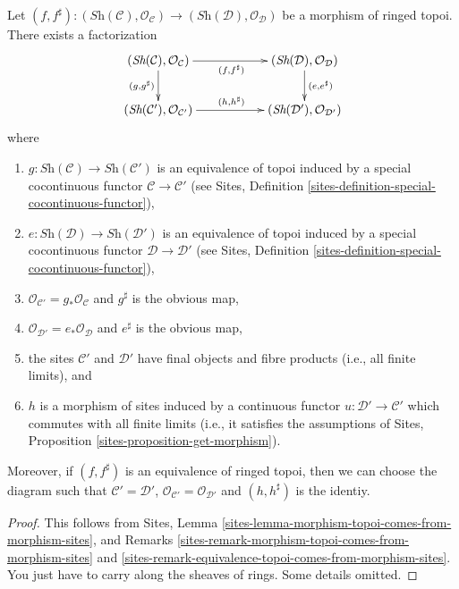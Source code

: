 \begin{lemma}
\label{lemma-morphism-ringed-topoi-comes-from-morphism-ringed-sites}
Let $(f, f^\sharp) :
(\textit{Sh}(\mathcal{C}), \mathcal{O}_{\mathcal{C}})
\to (\textit{Sh}(\mathcal{D}), \mathcal{O}_{\mathcal{D}})$
be a morphism of ringed topoi. There exists a factorization
$$
\xymatrix{
(\textit{Sh}(\mathcal{C}), \mathcal{O}_{\mathcal{C}})
\ar[rr]_{(f, f^\sharp)}
\ar[d]_{(g, g^\sharp)}
& &
(\textit{Sh}(\mathcal{D}), \mathcal{O}_{\mathcal{D}}) \ar[d]^{(e, e^\sharp)}
\\
(\textit{Sh}(\mathcal{C}'), \mathcal{O}_{\mathcal{C}'})
\ar[rr]^{(h, h^\sharp)} & &
(\textit{Sh}(\mathcal{D}'), \mathcal{O}_{\mathcal{D}'})
}
$$
where
\begin{enumerate}
\item $g : \textit{Sh}(\mathcal{C}) \to \textit{Sh}(\mathcal{C}')$
is an equivalence of topoi induced by a special cocontinuous functor
$\mathcal{C} \to \mathcal{C}'$ (see
Sites, Definition \ref{sites-definition-special-cocontinuous-functor}),
\item $e : \textit{Sh}(\mathcal{D}) \to \textit{Sh}(\mathcal{D}')$
is an equivalence of topoi induced by a special cocontinuous functor
$\mathcal{D} \to \mathcal{D}'$ (see
Sites, Definition \ref{sites-definition-special-cocontinuous-functor}),
\item $\mathcal{O}_{\mathcal{C}'} = g_*\mathcal{O}_{\mathcal{C}}$
and $g^\sharp$ is the obvious map,
\item $\mathcal{O}_{\mathcal{D}'} = e_*\mathcal{O}_{\mathcal{D}}$
and $e^\sharp$ is the obvious map,
\item the sites $\mathcal{C}'$ and $\mathcal{D}'$ have final objects
and fibre products (i.e., all finite limits), and
\item $h$ is a morphism of sites induced by a continuous functor
$u : \mathcal{D}' \to \mathcal{C}'$ which commutes with all finite limits
(i.e., it satisfies the assumptions of
Sites, Proposition \ref{sites-proposition-get-morphism}).
\end{enumerate}
Moreover, if $(f, f^\sharp)$ is an equivalence of ringed topoi,
then we can choose the diagram such that
$\mathcal{C}' = \mathcal{D}'$, 
$\mathcal{O}_{\mathcal{C}'} = \mathcal{O}_{\mathcal{D}'}$
and $(h, h^\sharp)$ is the identiy.
\end{lemma}

\begin{proof}
This follows from
Sites, Lemma \ref{sites-lemma-morphism-topoi-comes-from-morphism-sites},
and Remarks
\ref{sites-remark-morphism-topoi-comes-from-morphism-sites}
and
\ref{sites-remark-equivalence-topoi-comes-from-morphism-sites}.
You just have to carry along the sheaves of rings. Some details omitted.
\end{proof}







